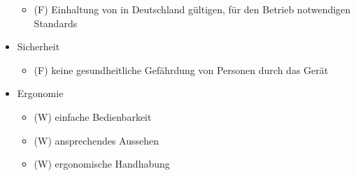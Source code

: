 \begin{itemize}
	\begin{itemize}
		\item (F) Einhaltung von in Deutschland gültigen, für den Betrieb notwendigen
	 Standards
	\end{itemize}
\item Sicherheit
	\begin{itemize}
		\item (F) keine gesundheitliche Gefährdung von Personen durch das Gerät
	\end{itemize}
\item Ergonomie
	\begin{itemize}
		\item (W) einfache Bedienbarkeit
		\item (W) ansprechendes Aussehen
		\item (W) ergonomische Handhabung
	\end{itemize}
\end{itemize}